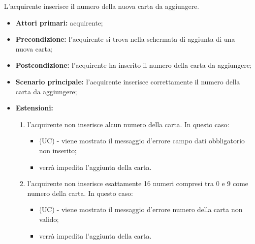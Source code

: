 L'acquirente inserisce il numero della nuova carta da aggiungere.
\begin{itemize}
    \item \textbf{Attori primari:} acquirente;
    \item \textbf{Precondizione:} l'acquirente si trova nella schermata di aggiunta di una nuova carta;
    \item \textbf{Postcondizione:} l'acquirente ha inserito il numero della carta da aggiungere;
    \item \textbf{Scenario principale:} l'acquirente inserisce correttamente il numero della carta da aggiungere;
    \item \textbf{Estensioni:}
    \begin{enumerate}[label=\lett]
        \item l'acquirente non inserisce alcun numero della carta. In questo caso:
        \begin{itemize}
            \item (UC) - viene mostrato il messaggio d'errore campo dati obbligatorio non inserito;
            \item verrà impedita l'aggiunta della carta.
        \end{itemize}
        \item l'acquirente non inserisce esattamente 16 numeri compresi tra 0 e 9 come numero della carta. In questo caso:
        \begin{itemize}
            \item (UC) - viene mostrato il messaggio d'errore numero della carta non valido;
            \item verrà impedita l'aggiunta della carta.
        \end{itemize}
    \end{enumerate}
\end{itemize}

